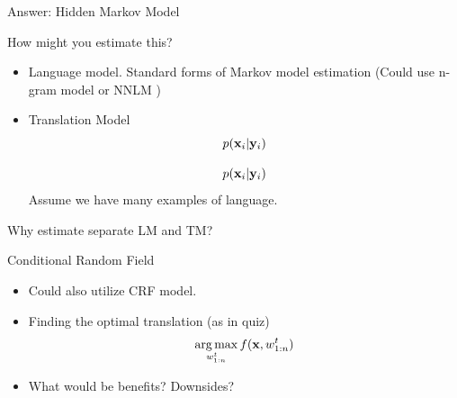 \documentclass{beamer}
\begin{document}
\begin{frame}{Answer: Hidden Markov Model}
  \begin{center}  
\end{center}  
\end{frame}






\begin{frame}{How might you estimate this?}  
  \begin{itemize}
  \item Language model. Standard forms of Markov model estimation
    (Could use n-gram model or NNLM )
  \item Translation Model
  \[ p(\mathbf{x}_i | \mathbf{y}_i)  \]


  \[ p(\mathbf{x}_i | \mathbf{y}_i )\] 
  Assume we have many examples of language. 
  \end{itemize}

  Why estimate separate LM and TM?
\end{frame}


\begin{frame}{Conditional Random Field}
  \begin{itemize}
  \item Could also utilize CRF model. 
    \air 
  \item Finding the optimal translation (as in quiz)
    \[ \argmax_{w^t_{1:n}} f(\boldx, w^t_{1:n}) \] 
    
    \air
  \item What would be benefits? Downsides?
  \end{itemize}

\end{frame}
\end{document}
